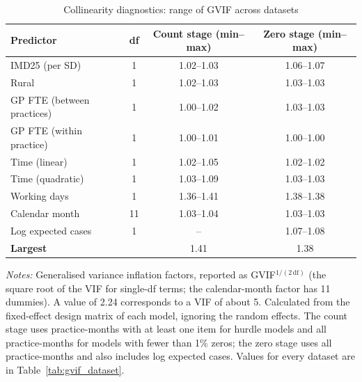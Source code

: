 \begin{table}[htbp]
\centering
\caption{Collinearity diagnostics: range of GVIF across datasets}
\label{tab:gvif}
\footnotesize
\begin{tabular}{lccc}
\toprule
Predictor & df & Count stage (min--max) & Zero stage (min--max) \\
\midrule
IMD25 (per SD) & 1 & 1.02--1.03 & 1.06--1.07 \\
Rural & 1 & 1.02--1.03 & 1.03--1.03 \\
GP FTE (between practices) & 1 & 1.00--1.02 & 1.03--1.03 \\
GP FTE (within practice) & 1 & 1.00--1.01 & 1.00--1.00 \\
Time (linear) & 1 & 1.02--1.05 & 1.02--1.02 \\
Time (quadratic) & 1 & 1.03--1.09 & 1.03--1.03 \\
Working days & 1 & 1.36--1.41 & 1.38--1.38 \\
Calendar month & 11 & 1.03--1.04 & 1.03--1.03 \\
Log expected cases & 1 & -- & 1.07--1.08 \\
\midrule
\textbf{Largest} & & 1.41 & 1.38 \\
\bottomrule
\end{tabular}
\par\vspace{4pt}
{\footnotesize \textit{Notes:} Generalised variance inflation factors, reported as GVIF$^{1/(2\,\mathrm{df})}$ (the square root of the VIF for single-df terms; the calendar-month factor has 11 dummies). A value of 2.24 corresponds to a VIF of about 5. Calculated from the fixed-effect design matrix of each model, ignoring the random effects. The count stage uses practice-months with at least one item for hurdle models and all practice-months for models with fewer than 1\% zeros; the zero stage uses all practice-months and also includes log expected cases. Values for every dataset are in Table~\ref{tab:gvif_dataset}.\par}
\end{table}

